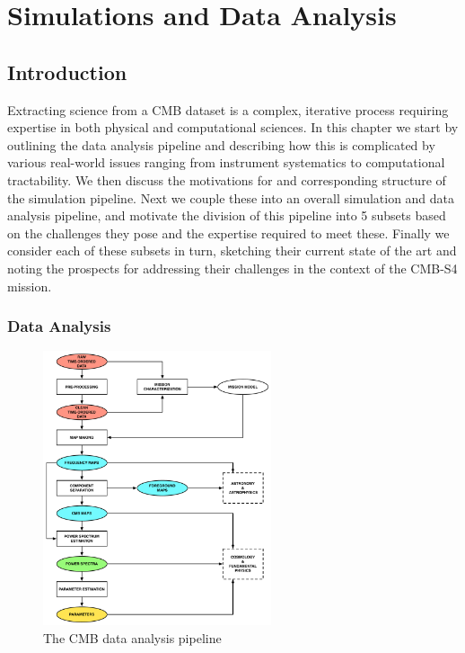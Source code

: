  
\chapter{Simulations and Data Analysis}
\renewcommand*\thesection{\arabic{section}}


\section{Introduction}

Extracting science from a CMB dataset is a complex, iterative process requiring expertise in both physical and computational sciences. In this chapter we start by outlining the data analysis pipeline and describing how this is complicated by various real-world issues ranging from instrument systematics to computational tractability. We then discuss the motivations for and corresponding structure of the simulation pipeline. Next we couple these into an overall simulation and data analysis pipeline, and motivate the division of this pipeline into 5 subsets based on the challenges they pose and the expertise required to meet these. Finally we consider each of these subsets in turn, sketching their current state of the art and noting the prospects for addressing their challenges in the context of the CMB-S4 mission.

\subsection{Data Analysis}

\begin{figure}[htbp]
\hspace*{2.6in}\includegraphics[width=0.6\textwidth]{Analysis/da}
\caption{The CMB data analysis pipeline}
\label{fig_da}
\end{figure}

